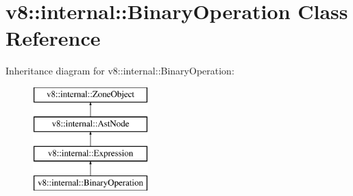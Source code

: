 \hypertarget{classv8_1_1internal_1_1_binary_operation}{}\section{v8\+:\+:internal\+:\+:Binary\+Operation Class Reference}
\label{classv8_1_1internal_1_1_binary_operation}
Inheritance diagram for v8\+:\+:internal\+:\+:Binary\+Operation\+:\begin{figure}[H]
\begin{center}
\leavevmode
\includegraphics[height=4.000000cm]{classv8_1_1internal_1_1_binary_operation}
\end{center}
\end{figure}
